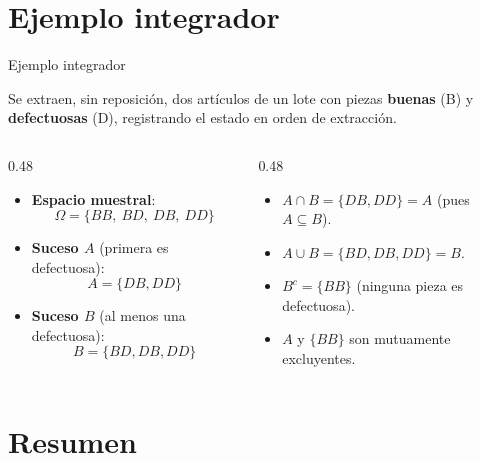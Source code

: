 \documentclass[aspectratio=169,11pt]{beamer}
\begin{document}
\section{Ejemplo integrador}

\begin{frame}{Ejemplo integrador}
\begin{example}
Se extraen, sin reposición, dos artículos de un lote con piezas \textbf{buenas} (B) y \textbf{defectuosas} (D), registrando el estado en orden de extracción.
\end{example}

\begin{columns}[t]
\begin{column}{0.48\textwidth}
\begin{itemize}\small
\item \textbf{Espacio muestral}:
  \[\Omega = \{BB,\ BD,\ DB,\ DD\}\]
\item \textbf{Suceso $A$} (primera es defectuosa):
  \[A = \{DB, DD\}\]
\item \textbf{Suceso $B$} (al menos una defectuosa):
  \[B = \{BD, DB, DD\}\]
\end{itemize}
\end{column}

\begin{column}{0.48\textwidth}
\begin{itemize}\small
\item $A \cap B = \{DB,DD\} = A$ (pues $A \subseteq B$).
\item $A \cup B = \{BD,DB,DD\} = B$.
\item $B^c = \{BB\}$ (ninguna pieza es defectuosa).
\item $A$ y $\{BB\}$ son mutuamente excluyentes.
\end{itemize}
\end{column}
\end{columns}
\end{frame}

\section{Resumen}
\end{document}
